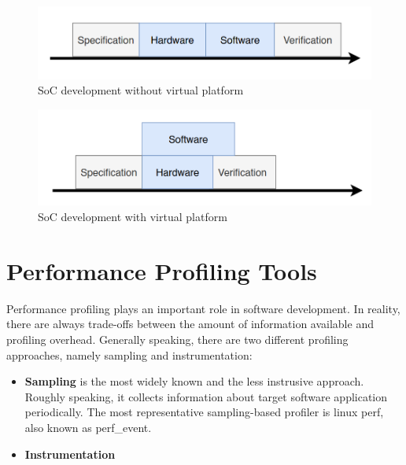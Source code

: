 \begin{figure}
    \centering
    \includegraphics[width=.65\linewidth]{figures/Virtual_platform_without.png}
    \caption{SoC development without virtual platform}
    \label{fig:virtual_platform_without}
\end{figure}

\begin{figure}
    \centering
    \includegraphics[width=.6\linewidth]{figures/Virtual_platform.png}
    \caption{SoC development with virtual platform}
    \label{fig:virtual_platform}
\end{figure}


\section{Performance Profiling Tools}
Performance profiling plays an important role in software development. In reality, there are always trade-offs between the amount of information available and profiling overhead. Generally speaking, there are two different profiling approaches, namely sampling and instrumentation:

\begin{itemize}
    \item \textbf{Sampling} is the most widely known and the less instrusive approach. Roughly speaking, it collects information about target software application periodically. The most representative sampling-based profiler is linux perf, also known as perf\_event. 
    \item \textbf{Instrumentation} 
\end{itemize}